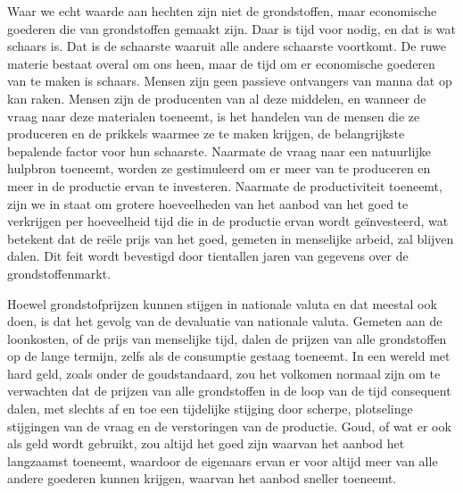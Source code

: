 Waar we echt waarde aan hechten zijn niet de grondstoffen, maar
economische goederen die van grondstoffen gemaakt zijn. Daar is tijd
voor nodig, en dat is wat schaars is. Dat is de schaarste waaruit alle
andere schaarste voortkomt. De ruwe materie bestaat overal om ons heen,
maar de tijd om er economische goederen van te maken is schaars. Mensen
zijn geen passieve ontvangers van manna dat op kan raken. Mensen zijn de
producenten van al deze middelen, en wanneer de vraag naar deze
materialen toeneemt, is het handelen van de mensen die ze produceren en de
prikkels waarmee ze te maken krijgen, de belangrijkste bepalende factor
voor hun schaarste. Naarmate de vraag naar een natuurlijke hulpbron
toeneemt, worden ze gestimuleerd om er meer van te produceren en meer in
de productie ervan te investeren. Naarmate de productiviteit toeneemt,
zijn we in staat om grotere hoeveelheden van het aanbod van het goed te
verkrijgen per hoeveelheid tijd die in de productie ervan wordt
geïnvesteerd, wat betekent dat de reële prijs van het goed, gemeten in
menselijke arbeid, zal blijven dalen. Dit feit wordt bevestigd door
tientallen jaren van gegevens over de grondstoffenmarkt.

Hoewel grondstofprijzen kunnen stijgen in nationale valuta en dat
meestal ook doen, is dat het gevolg van de devaluatie van nationale
valuta. Gemeten aan de loonkosten, of de prijs van menselijke tijd,
dalen de prijzen van alle grondstoffen op de lange termijn, zelfs als de
consumptie gestaag toeneemt. In een wereld met hard geld, zoals onder de
goudstandaard, zou het volkomen normaal zijn om te verwachten dat de
prijzen van alle grondstoffen in de loop van de tijd consequent dalen,
met slechts af en toe een tijdelijke stijging door scherpe, plotselinge stijgingen van de vraag en de verstoringen van de productie. Goud, of wat
er ook als geld wordt gebruikt, zou altijd het goed zijn waarvan het
aanbod het langzaamst toeneemt, waardoor de eigenaars ervan er voor
altijd meer van alle andere goederen kunnen krijgen, waarvan het aanbod
sneller toeneemt.

